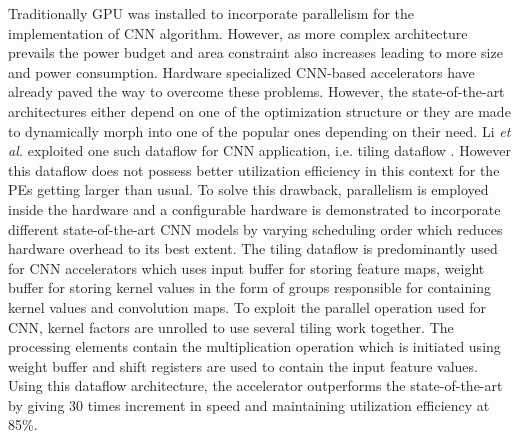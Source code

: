 \documentclass[journal]{IEEEtran}
\begin{document}
\par Traditionally GPU was installed to incorporate parallelism for the implementation of CNN algorithm. However, as more complex architecture prevails the power budget and area constraint also increases leading to more size and power consumption. Hardware specialized CNN-based accelerators have already paved the way to overcome these problems. However, the state-of-the-art architectures either depend on one of the optimization structure or they are made to dynamically morph into one of the popular ones depending on their need. Li \textit{et al.} exploited one such dataflow for CNN application, i.e. tiling dataflow \cite{paper30}. However this dataflow does not possess better utilization efficiency in this context for the PEs getting larger than usual. To solve this drawback, parallelism is employed inside the hardware and a configurable hardware is demonstrated to incorporate different state-of-the-art CNN models by varying scheduling order which reduces hardware overhead to its best extent. The tiling dataflow is predominantly used for CNN accelerators which uses input buffer for storing feature maps, weight buffer for storing kernel values in the form of groups responsible for containing kernel values and convolution maps. To exploit the parallel operation used for CNN, kernel factors are unrolled to use several tiling work together. The processing elements contain the multiplication operation which is initiated using weight buffer and shift registers are used to contain the input feature values. Using this dataflow architecture, the accelerator outperforms the state-of-the-art by giving 30 times increment in speed and maintaining utilization efficiency at 85\%. 
\end{document}
